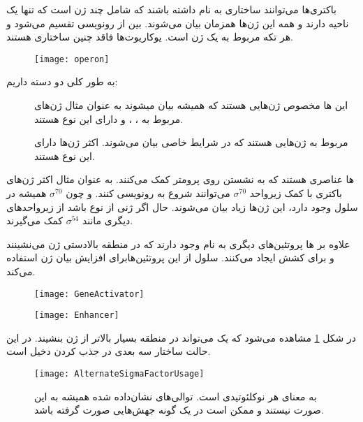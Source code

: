 باکتری‌ها می‌توانند ساختاری به نام
داشته باشند که شامل چند ژن است که تنها یک ناحیه
دارند و همه این ژن‌ها همزمان بیان می‌شوند. بین از رونویسی
تقسیم می‌شود و هر تکه مربوط به یک ژن است.
یوکاریوت‌ها فاقد چنین ساختاری هستند.

\begin{figure}[htbp]
\centering
\texttt{[image: operon]}
\end{figure}

\noindent
به طور کلی دو دسته
داریم:
\begin{description}
\item[]
این
ها مخصوص ژن‌هایی هستند که همیشه بیان میشوند به عنوان مثال
ژن‌های مربوط به
،
،
و
دارای این نوع
هستند.
\item[]
مربوط به ژن‌هایی هستند که در شرایط خاصی بیان می‌شوند. اکثر ژن‌ها دارای این نوع
هستند.
\end{description}

ها عناصری هستند که به نشستن
روی پرومتر کمک می‌کنند. به عنوان مثال اکثر ژن‌های باکتری با کمک زیرواحد
$\sigma^{70}$
می‌توانند شروع به رونویسی کنند. و چون
$\sigma^{70}$
همیشه در سلول وجود دارد، این ژن‌ها زیاد بیان می‌شوند. حال اگر ژنی از نوع
باشد از زیرواحد‌های دیگری مانند
$\sigma^{54}$
کمک می‌گیرند.

\pagebreak
علاوه بر
ها پروتئین‌های دیگری به نام
وجود دارند که در منطقه بالادستی ژن می‌نشینند و برای
کشش ایجاد می‌کنند. سلول از این پروتئین‌هابرای افزایش بیان ژن استفاده می‌کند.

\begin{figure}[htbp]
\centering
\texttt{[image: GeneActivator]}
\end{figure}

\begin{figure}[htbp]
\centering
\texttt{[image: Enhancer]}
\caption{}
\label{figure:enhancer}
\end{figure}

در شکل
\ref{figure:enhancer}
مشاهده می‌شود که یک
می‌تواند در منطقه بسیار بالاتر از ژن بنشیند. در این حالت ساختار سه بعدی
در جذب کردن
دخیل است.

\begin{figure}[htbp]
\centering
\texttt{[image: AlternateSigmaFactorUsage]}
\caption{
به معنای هر نوکلئوتیدی است. توالی‌های نشان‌داده شده همیشه به این صورت نیستند و ممکن است در یک گونه جهش‌هایی صورت گرفته باشد.}
\label{figure:alternateSigma}
\end{figure}

